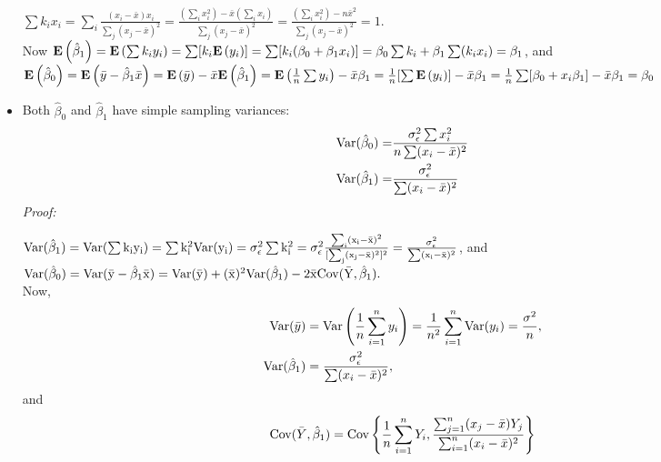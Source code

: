 \begin{itemize}
\begin{pf}
  $\sum k_i x_i = \sum_i \frac{(x_i - \bar{x})x_i}{\sum_j(x_j - \bar{x})^2} = \frac{(\sum_i x_i^2) - \bar{x} (\sum_i x_i)}{\sum_j(x_j - \bar{x})^2} = \frac{(\sum_i x_i^2) - n \bar{x}^2}{\sum_j(x_j - \bar{x})^2} = 1$.\\
  Now $\Expected{\hat{\beta}_1} = \Expected{\sum k_i y_i} = \sum[ k_i \Expected{y_i}] = \sum[k_i (\beta_0 + \beta_1 x_i)] = \beta_0 \sum k_i + \beta_1 \sum(k_i x_i) = \beta_1$,
 and  $\Expected{\hat{\beta}_0} = \Expected{\bar{y} - \hat{\beta}_1 \bar{x}} = \Expected{\bar{y}} - \bar{x} \Expected{\hat{\beta}_1} = \Expected{\frac{1}{n}\sum y_i} - \bar{x} \beta_1 = \frac{1}{n} [\sum \Expected{y_i}] - \bar{x} \beta_1
 =  \frac{1}{n} \sum [\beta_0 + x_i \beta_1] - \bar{x} \beta_1 = \beta_0$
\end{pf}
  \item Both $\hat{\beta}_0$ and $\hat{\beta}_1$ have simple sampling variances:
  $$
  \begin{aligned}
    \sVar(\hat{\beta}_0) =& \frac{\sigma^2_\epsilon \sum{x_i^2}}{n\sum(x_i - \bar{x})^2}\\
    \sVar(\hat{\beta}_1) =& \frac{\sigma^2_\epsilon}{\sum(x_i - \bar{x})^2}\\    
  \end{aligned}
  $$
  {\it Proof:} \\
  \begin{pf}
  $\sVar(\hat{\beta}_1) = \sVar(\sum k_i y_i) = \sum k_i^2 \sVar(y_i) = \sigma_\epsilon^2 \sum k_i^2 = \sigma_\epsilon^2 \frac{\sum_i(x_i - \bar{x})^2}{[\sum_j(x_j - \bar{x})^2]^2} = \frac{\sigma^2_\epsilon}{\sum(x_i - \bar{x})^2}$, 
  and $\sVar(\hat{\beta}_0) = \sVar(\bar{y} - \hat{\beta}_1 \bar{x}) = {\rm Var} (\bar{y}) + (\bar{x})^2 {\rm Var} (\hat{\beta}_1)
    - 2 \bar{x} {\rm Cov} (\bar{Y}, \hat{\beta}_1).$\\
    Now, 
    $$
    \begin{aligned}
    {\rm Var} (\bar{y})
& = {\rm Var} \left(\frac{1}{n} \sum_{i = 1}^n y_i \right)
  = \frac{1}{n^2} \sum_{i = 1}^n {\rm Var} (y_i)
  = \frac{\sigma^2}{n},\\
  \sVar(\hat{\beta}_1) &= \frac{\sigma^2_\epsilon}{\sum(x_i - \bar{x})^2},\\
  \end{aligned}
    $$
    and 
    $$
\begin{aligned}
{\rm Cov} (\bar{Y}, \hat{\beta}_1)
 &= {\rm Cov} \left\{
     \frac{1}{n} \sum_{i = 1}^n Y_i,
     \frac{ \sum_{j = 1}^n(x_j - \bar{x})Y_j }{ \sum_{i = 1}^n(x_i - \bar{x})^2 }
     \right \} \\

\end{aligned}$$
\end{pf}
\end{itemize}

